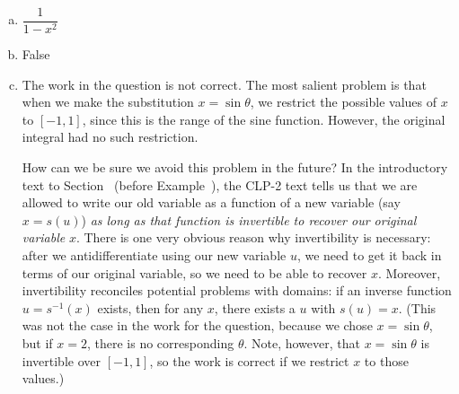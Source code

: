\begin{answer}

\begin{enumerate}[(a)]
\item $\dfrac{1}{1-x^2}$
\item False
\item The work in the question is not correct. The most salient problem is that when we make the substitution $x=\sin\theta$, we restrict the possible values of $x$ to $[-1,1]$, since this is the range of the sine function. However, the original integral had no such restriction.

How can we be sure we avoid this problem in the future? In the introductory text to Section~ (before Example~), the 
CLP-2 text tells us that we are allowed to write our old variable as a function of a new variable (say $x=s(u)$) \emph{as long as that function is invertible to recover our original variable} $x$. There is one very obvious reason why invertibility is necessary: after we antidifferentiate using our new variable $u$, we need to get it back in terms of our original variable, so we need to be able to recover $x$. Moreover, invertibility  reconciles  potential problems with domains: if an inverse function $u=s^{-1}(x)$ exists, then for any $x$, there exists a $u$ with $s(u)=x$. (This was not the case in the work for the question, because we chose $x=\sin \theta$, but if $x=2$, there is no corresponding $\theta$. Note, however, that $x=\sin\theta$ is invertible over $[-1,1]$,  so the work is correct if we restrict $x$ to those values.)

\end{enumerate}

\end{answer}
